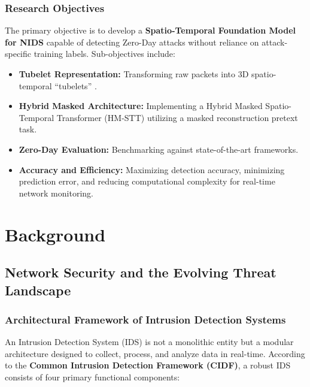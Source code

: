 \documentclass[12pt, a4paper]{report}
\begin{document}
\section*{Research Objectives}
The primary objective is to develop a \textbf{Spatio-Temporal Foundation Model for NIDS} capable of detecting Zero-Day attacks without reliance on attack-specific training labels. Sub-objectives include:
\begin{itemize}
    \item \textbf{Tubelet Representation:} Transforming raw packets into 3D spatio-temporal ``tubelets'' \cite{bertasius2021space}.
    \item \textbf{Hybrid Masked Architecture:} Implementing a Hybrid Masked Spatio-Temporal Transformer (HM-STT) utilizing a masked reconstruction pretext task.
    \item \textbf{Zero-Day Evaluation:} Benchmarking against state-of-the-art frameworks.
    \item \textbf{Accuracy and Efficiency:}  Maximizing detection accuracy, minimizing prediction error, and reducing computational complexity for real-time network monitoring.
\end{itemize}

\part{Background}
\chapter{Network Security and the Evolving Threat Landscape}



\section{Architectural Framework of Intrusion Detection Systems}
An Intrusion Detection System (IDS) is not a monolithic entity but a modular architecture designed to collect, process, and analyze data in real-time. According to the \textbf{Common Intrusion Detection Framework (CIDF)}, a robust IDS consists of four primary functional components:
\end{document}
